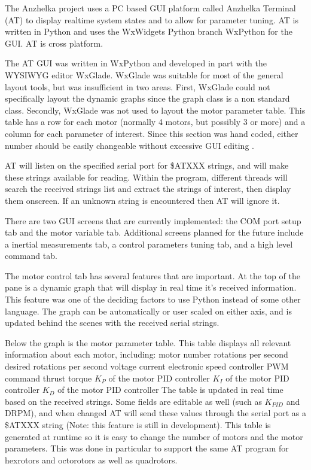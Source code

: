 \documentclass{article}
\numberwithin{equation}{section} %
\begin{document}
The Anzhelka project uses a PC based GUI platform called Anzhelka Terminal (AT) to display realtime system states and to allow for parameter tuning. AT is written in Python and uses the WxWidgets Python branch WxPython for the GUI. AT is cross platform.

The AT GUI was written in WxPython and developed in part with the WYSIWYG editor WxGlade. WxGlade was suitable for most of the general layout tools, but was insufficient in two areas. First, WxGlade could not specifically layout the dynamic graphs since the graph class is a non standard class. Secondly, WxGlade was not used to layout the motor parameter table. This table has a row for each motor (normally 4 motors, but possibly 3 or more) and a column for each parameter of interest. Since this section was hand coded, either number should be easily changeable without excessive GUI editing .

AT will listen on the specified serial port for \$ATXXX strings, and will  make these strings available for reading. Within the program, different threads will search the received strings list and extract the strings of interest, then display them onscreen. If an unknown string is encountered then AT will ignore it.

There are two GUI screens that are currently implemented: the COM port setup tab and the motor variable tab. Additional screens planned for the future include a inertial measurements tab, a control parameters tuning tab, and a high level command tab.

The motor control tab has several features that are important. At the top of the pane is a dynamic graph that will display in real time it's received information. This feature was one of the deciding factors to use Python instead of some other language. The graph can be automatically or user scaled on either axis, and is updated behind the scenes with the received serial strings.

Below the graph is the motor parameter table. This table displays all relevant information about each motor, including: 
motor number
rotations per second
desired rotations per second
voltage
current
electronic speed controller PWM command
thrust
torque
$K_P$ of the motor PID controller
$K_I$ of the motor PID controller
$K_D$ of the motor PID controller
The table is updated in real time based on the received strings. Some fields are editable as well (such as $K_{PID}$ and DRPM), and when changed AT will send these values through the serial port as a \$ATXXX string (Note: this feature is still in development). This table is generated at runtime so it is easy to change the number of motors and the motor parameters. This was done in particular to support the same AT program for hexrotors and octorotors as well as quadrotors.
\end{document}

